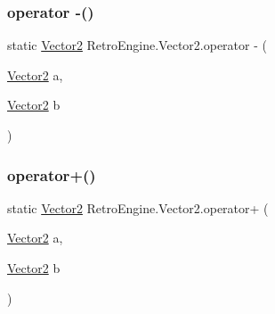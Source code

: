 \mbox{\label{struct_retro_engine_1_1_vector2_afc0d9035f5f038221f9bbbec22d6960a}} 
\subsubsection{\texorpdfstring{operator -\/()}{operator -()}}
{\footnotesize\ttfamily static \mbox{\hyperlink{struct_retro_engine_1_1_vector2}{Vector2}} Retro\+Engine.\+Vector2.\+operator -\/ (\begin{DoxyParamCaption}\item[{\mbox{\hyperlink{struct_retro_engine_1_1_vector2}{Vector2}}}]{a,  }\item[{\mbox{\hyperlink{struct_retro_engine_1_1_vector2}{Vector2}}}]{b }\end{DoxyParamCaption})\hspace{0.3cm}{\ttfamily [static]}}

\mbox{\label{struct_retro_engine_1_1_vector2_a8f743a389148aa2580669a910e5d55dc}} 
\subsubsection{\texorpdfstring{operator+()}{operator+()}\hspace{0.1cm}{\footnotesize\ttfamily [1/2]}}
{\footnotesize\ttfamily static \mbox{\hyperlink{struct_retro_engine_1_1_vector2}{Vector2}} Retro\+Engine.\+Vector2.\+operator+ (\begin{DoxyParamCaption}\item[{\mbox{\hyperlink{struct_retro_engine_1_1_vector2}{Vector2}}}]{a,  }\item[{\mbox{\hyperlink{struct_retro_engine_1_1_vector2}{Vector2}}}]{b }\end{DoxyParamCaption})\hspace{0.3cm}{\ttfamily [static]}}

\mbox{\label{struct_retro_engine_1_1_vector2_a61bd95d67d069695e6e58726d67b33c2}} 
